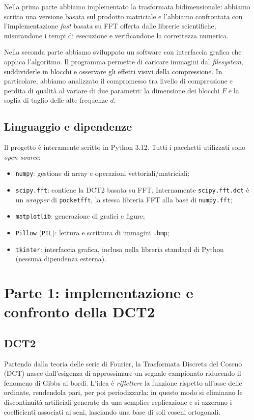 \documentclass[11pt,a4paper]{article}
\makeatletter
\let\@origtexttt\texttt
\renewcommand{\texttt}[1]{{\def\_{\textunderscore\discretionary{}{}{}}\@origtexttt{#1}}}
\makeatother
\begin{document}
Nella prima parte abbiamo implementato la trasformata bidimensionale: abbiamo scritto
una versione basata sul prodotto matriciale e l'abbiamo confrontata con l'implementazione
\textit{fast} basata su FFT offerta dalle librerie scientifiche, misurandone i tempi di
esecuzione e verificandone la correttezza numerica.

Nella seconda parte abbiamo sviluppato un software con interfaccia grafica che applica
l'algoritmo. Il programma permette di caricare immagini dal \textit{filesystem}, suddividerle
in blocchi e osservare gli effetti visivi della compressione. In particolare, abbiamo
analizzato il compromesso tra livello di compressione e perdita di qualità al variare di
due parametri: la dimensione dei blocchi $F$ e la soglia di taglio delle alte frequenze $d$.

\subsection{Linguaggio e dipendenze}

Il progetto è interamente scritto in Python 3.12. Tutti i pacchetti
utilizzati sono \emph{open source}:
\begin{itemize}
  \item \texttt{numpy}: gestione di array e operazioni vettoriali/matriciali;
  \item \texttt{scipy.fft}: contiene la DCT2 basata su FFT. Internamente
        \texttt{scipy.fft.dct} è un \emph{wrapper} di \texttt{pocketfft}, la
        stessa libreria FFT alla base di \texttt{numpy.fft};
  \item \texttt{matplotlib}: generazione di grafici e figure;
  \item \texttt{Pillow} (\texttt{PIL}): lettura e scrittura di immagini
        \texttt{.bmp};
  \item \texttt{tkinter}: interfaccia grafica, inclusa nella libreria standard
        di Python (nessuna dipendenza esterna).
\end{itemize}

\section{Parte 1: implementazione e confronto della DCT2}

\subsection{DCT2}

Partendo dalla teoria delle serie di Fourier, la Trasformata Discreta del Coseno (DCT) nasce dall'esigenza
di approssimare un segnale campionato riducendo il fenomeno di Gibbs ai bordi.
L'idea è \emph{riflettere} la funzione rispetto all'asse delle ordinate, rendendola pari,
per poi periodizzarla: in questo modo si eliminano le discontinuità artificiali
generate da una semplice replicazione e si azzerano i coefficienti associati ai seni,
lasciando una base di soli coseni ortogonali.
\end{document}
